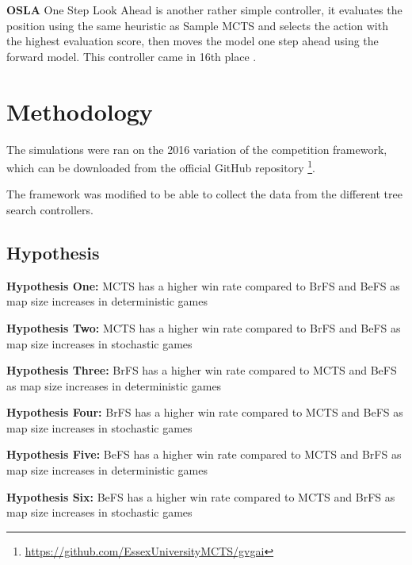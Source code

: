 \documentclass[journal]{IEEEtran}
\begin{document}
		\textbf{OSLA}
			One Step Look Ahead is another rather simple controller, it evaluates the position using the same heuristic as Sample MCTS and selects the action with the highest evaluation score, then moves the model one step ahead using the forward model. This controller came in 16th place \cite{perez20162014}.

	

	


\section{Methodology}	
	
	The simulations were ran on the 2016 variation of the competition framework, which can be downloaded from the official GitHub repository \footnote{ \url{https://github.com/EssexUniversityMCTS/gvgai}}.
	
	The framework was modified to be able to collect the data from the different tree search controllers.



\subsection{Hypothesis}
	\textbf{Hypothesis One:}
		MCTS has a higher win rate compared to BrFS and BeFS as map size increases in deterministic games %

	\textbf{Hypothesis Two:}
		MCTS has a higher win rate compared to BrFS and BeFS as map size increases in stochastic games %

	\textbf{Hypothesis Three:}
		BrFS has a higher win rate compared to MCTS and BeFS as map size increases in deterministic games %

	\textbf{Hypothesis Four:}
		BrFS has a higher win rate compared to MCTS and BeFS as map size increases in stochastic games %
		
	\textbf{Hypothesis Five:}
		BeFS has a higher win rate compared to  MCTS and BrFS as map size increases in deterministic games %

	\textbf{Hypothesis Six:}
		BeFS has a higher win rate compared to  MCTS and BrFS as map size increases in stochastic games %
\end{document}
